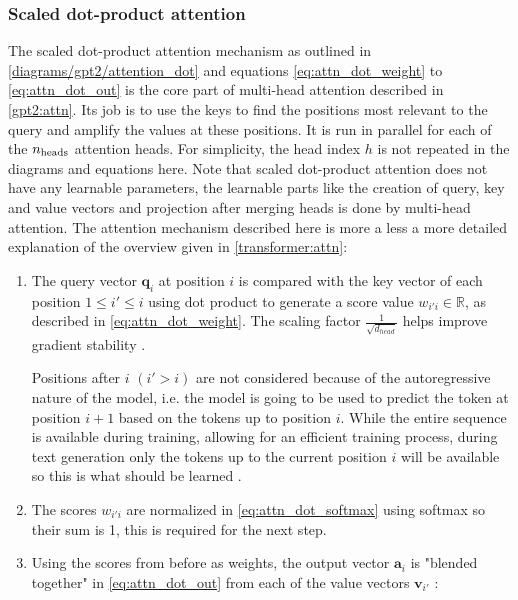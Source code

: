 \subsubsection{Scaled dot-product attention}
\label{gpt2:attn_dot}
The scaled dot-product attention mechanism as outlined in \cref{diagrams/gpt2/attention_dot} and equations \eqref{eq:attn_dot_weight} to \eqref{eq:attn_dot_out} is the core part of multi-head attention described in \cref{gpt2:attn}.
Its job is to use the keys to find the positions most relevant to the query and amplify the values at these positions.
It is run in parallel for each of the ${n_\textrm{heads}}$ attention heads. For simplicity, the head index $h$ is not repeated in the diagrams and equations here.
Note that scaled dot-product attention does not have any learnable parameters, the learnable parts like the creation of query, key and value vectors and projection after merging heads is done by multi-head attention.
The attention mechanism described here is more a less a more detailed explanation of the overview given in \cref{transformer:attn}:

\begin{enumerate}
\item The query vector $\mathbf{q}_i$ at position $i$ is compared with the key vector of each position $1 \leq i' \leq i$ using dot product to generate a score value $w_{i'i} \in \mathbb{R}$, as described in \cref{eq:attn_dot_weight}.
The scaling factor $\frac {1} {\sqrt{d_{head}}}$ helps improve gradient stability .

Positions after $i$ $(i' > i)$ are not considered because of the autoregressive nature of the model, i.e. the model is going to be used to predict the token at position $i+1$ based on the tokens up to position $i$. While the entire sequence is available during training, allowing for an efficient training process, during text generation only the tokens up to the current position $i$ will be available so this is what should be learned .

\item The scores $w_{i'i}$ are normalized in \cref{eq:attn_dot_softmax} using softmax so their sum is 1, this is required for the next step.

\item Using the scores from before as weights, the output vector $\mathbf{a}_i$ is "blended together" in \cref{eq:attn_dot_out} from each of the value vectors $\mathbf{v}_{i'}$ \cite{alammar-gpt2}:
\end{enumerate}

